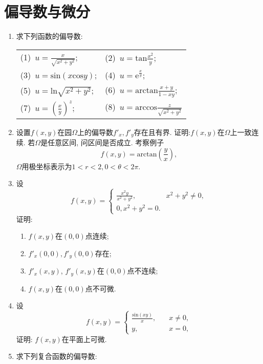 \section{偏导数与微分}
\begin{enumerate}
	\item 求下列函数的偏导数:
	\begin{table}[H]
		\begin{tabular}{ll}
			(1)\ $u=\frac{x}{\sqrt{x^2+y^2}}$;\qquad \qquad \qquad \qquad \qquad &(2)\ $u=\mathrm{tan}\frac{x^2}{y}$;\\
			(3)\ $u=\mathrm{sin}(x\mathrm{cos}y)$;\qquad \qquad \qquad \qquad \qquad &(4)\ 
			$u=\mathrm{e}^\frac{x}{y}$;\\
			(5)\ $u=\mathrm{ln}\sqrt{x^2+y^2}$;\qquad \qquad \qquad \qquad \qquad &(6)\ $
			u=\mathrm{arctan}\frac{x+y}{1-xy}$;\\
			(7)\ $u=(\frac{x}{y})^z$;\qquad \qquad \qquad \qquad \qquad &(8)\ $u=\mathrm{arccos}\frac{z}{\sqrt{x^2+y^2}}$ 
		\end{tabular}
	\end{table}
\item 设置$f(x,y)$在园$\Omega$上的偏导数$f'_x, f'_y$存在且有界. 证明:$f(x,y)$在$\Omega$上一致连续. 若$\Omega$是任意区间, 问区间是否成立. 考察例子
$$ f(x,y) = \mathrm{arctan}(\frac{y}{x}),$$
$\Omega$用极坐标表示为$1<r<2,0<\theta<2\pi$.
\item 设
$$ f(x,y)=\begin{cases}
\frac{x^2y}{x^2+y^2},\quad & x^2+y^2 \ne 0,\\
0, x^2+y^2 = 0. 
\end{cases}
$$
证明:
\begin{enumerate}
	\item $f(x,y)$在$(0,0)$点连续;
	\item $f'_x(0,0),f'_y(0,0)$存在;
	\item $f'_x(x,y)$, $f'_y(x,y)$在$(0,0)$点不连续;
	\item $f(x,y)$在$(0,0)$点不可微.
\end{enumerate}
\item 设$$f(x,y)=\begin{cases}
\frac{\mathrm{sin}(xy)}{x},\quad &x\ne0,\\
y,\quad &x=0,
\end{cases}$$
证明: $f(x,y)$在平面上可微.
\item 求下列复合函数的偏导数:
\begin{table}[H]
	\begin{tabular}{ll}

\end{tabular}
\end{table}
\end{enumerate}
